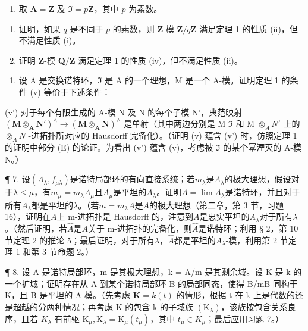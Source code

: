 \begin{enumerate}
\def\labelenumi{\arabic{enumi}.}
\setcounter{enumi}{4}
\tightlist
\item
  取 \(\mathbf{A} = \mathbf{Z}\) 及 \(\mathfrak{I} = p\mathbf{Z}\)，其中 \(p\) 为素数。
\end{enumerate}

\begin{enumerate}
\def\labelenumi{(\alph{enumi})}
\item
  证明，如果 \(q\) 是不同于 \(p\) 的素数，则 \(\mathbf{Z}\)-模 \(\mathbf{Z} / q\mathbf{Z}\) 满足定理 1 的性质 (ii)，但不满足性质 (i)。
\item
  证明 \(\mathbf{Z}\)-模 \(\mathbf{Q} / \mathbf{Z}\) 满足定理 1 的性质 (iv)，但不满足性质 (ii)。
\end{enumerate}

\begin{enumerate}
\def\labelenumi{\arabic{enumi}.}
\setcounter{enumi}{5}
\tightlist
\item
  设 A 是交换诺特环，\(\mathfrak{I}\) 是 A 的一个理想，M 是一个 A-模。证明定理 1 的条件 (v) 等价于下述条件：
\end{enumerate}

(v') 对于每个有限生成的 A-模 N 及 N 的每个子模 N'，典范映射 \((\mathbf{M} \otimes_{\mathbf{A}} \mathbf{N}')^{\wedge} \to (\mathbf{M} \otimes_{\mathbf{A}} \mathbf{N})^{\wedge}\) 是单射（其中两边分别是 M \(\mathfrak{I}\) 和 M \(\otimes_{A} N'\) 上的 \(\otimes_{A} N\) -进拓扑所对应的 Hausdorff 完备化）。（证明 (v) 蕴含 (v') 时，仿照定理 1 的证明中部分 (E) 的论证。为看出 (v') 蕴含 (v)，考虑被 \(\mathfrak{I}\) 的某个幂湮灭的 A-模 N。）

¶ 7. 设\((A_{\lambda}, f_{\mu\lambda})\)是诺特局部环的有向直接系统；若\(m_{\lambda}\)是\(A_{\lambda}\)的极大理想，假设对于\(\lambda \leqslant \mu\)，有\(m_{\mu} = m_{\lambda}A_{\mu}\)且\(A_{\mu}\)是平坦的\(A_{\lambda}\)。证明\(A = \lim A_{\lambda}\)是诺特环，并且对于所有\(A_{\lambda}\)都是平坦的\(\lambda\)。（若\(m = m_{\lambda}A\)是\(A\)的极大理想（第二章，第 3 节，习题 16），证明在\(A\)上 m-进拓扑是 Hausdorff 的，注意到\(A\)是忠实平坦的\(A_{\lambda}\)对于所有\(\lambda\)。（然后证明，若\(\hat{A}\)是\(A\)关于 m-进拓扑的完备化，则\(\hat{A}\)是诺特环；利用 § 2，第 10 节定理 2 的推论 5；最后证明，对于所有\(\lambda\)，\(\hat{A}\)都是平坦的\(A_{\lambda}\)-模，利用第 2 节定理 1 和第 3 节命题 2。）

¶ 8. 设 A 是诺特局部环，m 是其极大理想，k = A/m 是其剩余域。设 K 是 k 的一个扩域；证明存在从 A 到某个诺特局部环 B 的局部同态，使得 B/mB 同构于 K，且 B 是平坦的 A-模。（先考虑 \(\mathbf{K} = k(t)\) 的情形，根据 t 在 k 上是代数的还是超越的分两种情况；再考虑 K 的包含 k 的子域族 \((\mathrm{K}_{\lambda})\)，该族按包含关系良序，且若 \(K_{\lambda}\) 有前驱 \(\mathrm{K}_{\mu}, \mathrm{K}_{\lambda} = \mathrm{K}_{\mu}(t_{\mu})\)，其中 \(t_{\mu} \in K_{\mu}\)；最后应用习题 7。）

